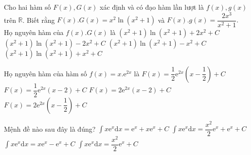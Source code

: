 \begin{ex}
	Cho hai hàm số $ F(x),G(x)$ xác định và có đạo hàm lần lượt là $ f(x),g(x)$ trên $\mathbb{R}$. Biết rằng $ F(x).G(x)=x^2\ln\left(x^2+1\right)$ và $ F(x).g(x)=\dfrac{2x^3}{x^2+1}.$ Họ nguyên hàm của $ f(x).G(x)$ là
	\choice
	{$\left(x^2+1\right)\ln\left(x^2+1\right)+2x^2+C$}
	{$\left(x^2+1\right)\ln\left(x^2+1\right)-2x^2+C$}
	{\True $\left(x^2+1\right)\ln\left(x^2+1\right)-x^2+C$}
	{$\left(x^2+1\right)\ln\left(x^2+1\right)+x^2+C$}
\end{ex}
\begin{ex}%
	Họ nguyên hàm của hàm số $ f(x)=x.\mathrm{e}^{2x}$ là
	\choice
	{\True $ F(x)=\dfrac{1}{2}{\mathrm{e}^{2x}}\left(x-\dfrac{1}{2}\right)+C$}
	{$ F(x)=\dfrac{1}{2}{\mathrm{e}^{2x}}\left(x-2\right)+C$}
	{$ F(x)=2\mathrm{e}^{2x}\left(x-2\right)+C$}
	{$ F(x)=2\mathrm{e}^{2x}\left(x-\dfrac{1}{2}\right)+C$}
\end{ex}
\begin{ex}
	Mệnh đề nào sau đây là đúng?
	\choice
	{$\displaystyle\int{x{\mathrm{e}^x}}\mathrm{d}x=\mathrm{e}^x+x{\mathrm{e}^x}+C$}
	{$\displaystyle\int{x{\mathrm{e}^x}}\mathrm{d}x=\dfrac{x^2}{2}{\mathrm{e}^x}+\mathrm{e}^x+C$}
	{\True $\displaystyle\int{x{\mathrm{e}^x}\mathrm{d}x}=x{\mathrm{e}^x}-\mathrm{e}^x+C$}
	{$\displaystyle\int{x{\mathrm{e}^x}}\mathrm{d}x=\dfrac{x^2}{2}{\mathrm{e}^x}+C$}
\end{ex}
